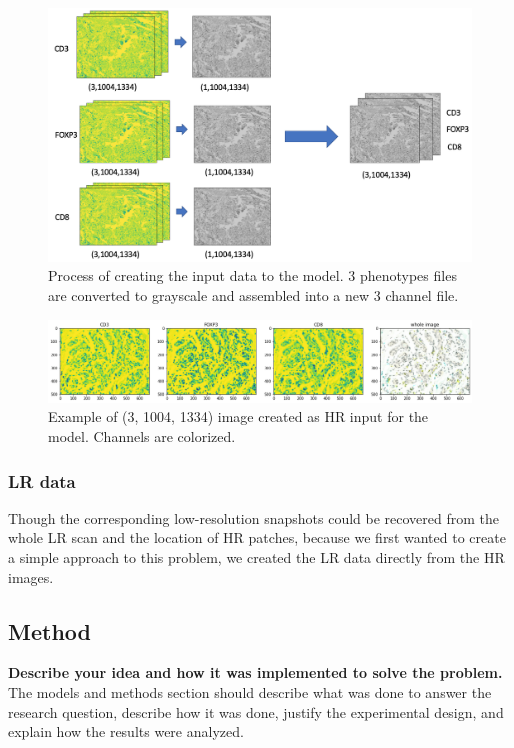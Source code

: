 \documentclass[11pt,conference,compsocconf]{IEEEtran}
\begin{document}
\begin{figure}[tbp]
  \centering
  \includegraphics[width=\columnwidth]{doc/report/images/process_data.jpg}
  \caption{Process of creating the input data to the model. 3 phenotypes files are converted to grayscale and assembled into a new 3 channel file.}
  \vspace{-3mm}
  \label{fig:process_data}
\end{figure}

\begin{figure}[tbp]
  \centering
  \includegraphics[width=\columnwidth]{doc/report/images/example_data_2.png}
  \caption{Example of (3, 1004, 1334) image created as HR input for the model. Channels are colorized.}
  \vspace{-3mm}
  \label{fig:example_data}
\end{figure}

\subsubsection{LR data}\label{subsubsection:LR_data} Though the corresponding low-resolution snapshots could be recovered from the whole LR scan and the location of HR patches, because we first wanted to create a simple approach to this problem, we created the LR data directly from the HR images.  

\subsection{Method}
\textbf{ Describe your idea and how it was implemented to solve
  the problem.}
The models and methods
section should describe what was
done to answer the research question, describe how it was done,
justify the experimental design, and
explain how the results were analyzed.
\end{document}
